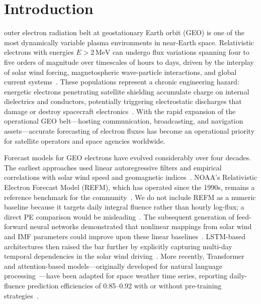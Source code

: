 ﻿\documentclass{ieeeaccess}
\begin{document}
\titlepgskip=-15pt
\maketitle

\section{Introduction}
\label{sec:introduction}
 outer electron radiation belt at geostationary Earth orbit
(GEO) is one of the most dynamically variable plasma environments in near-Earth
space. Relativistic electrons with energies \(E>2\,\mathrm{MeV}\) can undergo
flux variations spanning four to five orders of magnitude over timescales of
hours to days, driven by the interplay of solar wind forcing, magnetospheric
wave-particle interactions, and global current systems~\cite{b1,b2,b3}. These
populations represent a chronic engineering hazard: energetic electrons
penetrating satellite shielding accumulate charge on internal dielectrics and
conductors, potentially triggering electrostatic discharges that damage or
destroy spacecraft electronics~\cite{b1}. With the rapid expansion of the
operational GEO belt---hosting communication, broadcasting, and navigation
assets---accurate forecasting of electron fluxes has become an operational
priority for satellite operators and space agencies worldwide.

Forecast models for GEO electrons have evolved considerably over four decades.
The earliest approaches used linear autoregressive filters and empirical
correlations with solar wind speed and geomagnetic indices~\cite{b4,b5}.
NOAA's Relativistic Electron Forecast Model (REFM), which has operated since
the 1990s, remains a reference benchmark for the community~\cite{b5}.
We do not include REFM as a numeric baseline because it targets daily integral
fluence rather than hourly log-flux; a direct PE comparison would be
misleading~\cite{b5}.
The subsequent generation of feed-forward neural networks demonstrated that
nonlinear mappings from solar wind and IMF parameters could improve upon these
linear baselines~\cite{b7,b8}. LSTM-based architectures then raised the bar
further by explicitly capturing multi-day temporal dependencies in the
solar wind driving~\cite{b9,b10,b11,b12}. More recently, Transformer and
attention-based models---originally developed for natural language
processing~\cite{b13}---have been adapted for space weather time series,
reporting daily-fluence prediction efficiencies of 0.85--0.92 with or without
pre-training strategies~\cite{b14,b15,b16}.
\end{document}
